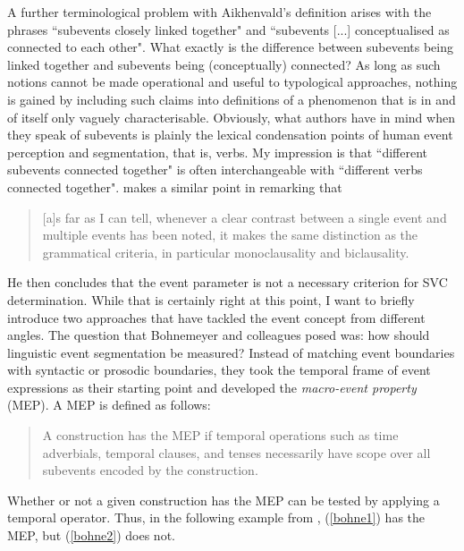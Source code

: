 A further terminological problem with Aikhenvald's definition arises with the phrases ``subevents closely linked together" and ``subevents [...] conceptualised as connected to each other". What exactly is the difference between subevents being linked together and subevents being (conceptually) connected? As long as such notions cannot be made operational and useful to typological approaches, nothing is gained by including such claims into definitions of a phenomenon that is in and of itself only vaguely characterisable. Obviously, what authors have in mind when they speak of subevents is plainly the lexical condensation points of human event perception and segmentation, that is, verbs. My impression is that ``different subevents connected together" is often interchangeable with ``different verbs connected together". \citet[15]{haspelmath2016serial} makes a similar point in remarking that

\begin{quote}[a]s far as I can tell, whenever a clear contrast between a single event and multiple events has been noted, it makes the same distinction as the grammatical criteria, in particular
monoclausality and biclausality.\end{quote}

He then concludes that the event parameter is not a necessary criterion for SVC determination. While that is certainly right at this point, I want to briefly introduce two approaches that have tackled the event concept from different angles. The question that Bohnemeyer and colleagues \citep{bohnemeyer2007principles, bohnemeyer2011} posed was: how should linguistic event segmentation be measured? Instead of matching event boundaries with syntactic or prosodic boundaries, they took the temporal frame of event expressions as their starting point and developed the \textit{macro-event property} (MEP). A MEP is defined as follows:

\begin{quote}A construction has the MEP if temporal operations such as time adverbials, temporal clauses, and tenses necessarily have scope over all subevents encoded by the construction. \citep[497]{bohnemeyer2007principles}\end{quote}

Whether or not a given construction has the MEP can be tested by applying a temporal operator. Thus, in the following example from \citet[503f.]{bohnemeyer2007principles}, (\ref{bohne1}) has the MEP, but (\ref{bohne2}) does not.

